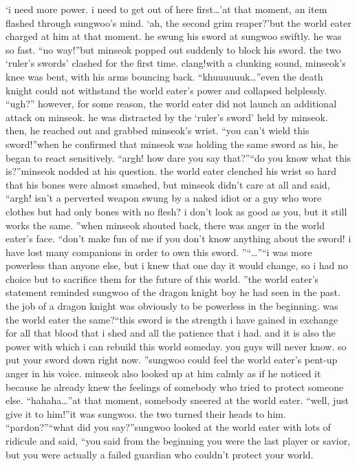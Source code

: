 ‘i need more power.
 i need to get out of here first…’at that moment, an item flashed through sungwoo’s mind.
‘ah, the second grim reaper?’but the world eater charged at him at that moment.
 he swung his sword at sungwoo swiftly.
he was so fast.
“no way!”but minseok popped out suddenly to block his sword.
the two ‘ruler’s swords’ clashed for the first time.
clang!with a clunking sound, minseok’s knee was bent, with his arms bouncing back.
“khuuuuuuk…”even the death knight could not withstand the world eater’s power and collapsed helplessly.
“ugh?”
however, for some reason, the world eater did not launch an additional attack on minseok.
he was distracted by the ‘ruler’s sword’ held by minseok.
 then, he reached out and grabbed minseok’s wrist.
“you can’t wield this sword!”when he confirmed that minseok was holding the same sword as his, he began to react sensitively.
“argh! how dare you say that?”“do you know what this is?”minseok nodded at his question.
the world eater clenched his wrist so hard that his bones were almost smashed, but minseok didn’t care at all and said, “argh! isn’t a perverted weapon swung by a naked idiot or a guy who wore clothes but had only bones with no flesh? i don’t look as good as you, but it still works the same.
”when minseok shouted back, there was anger in the world eater’s face.
“don’t make fun of me if you don’t know anything about the sword! i have lost many companions in order to own this sword.
”“…”“i was more powerless than anyone else, but i knew that one day it would change, so i had no choice but to sacrifice them for the future of this world.
”the world eater’s statement reminded sungwoo of the dragon knight boy he had seen in the past.
 the job of a dragon knight was obviously to be powerless in the beginning.
 was the world eater the same?“this sword is the strength i have gained in exchange for all that blood that i shed and all the patience that i had.
 and it is also the power with which i can rebuild this world someday.
 you guys will never know.
 so put your sword down right now.
”sungwoo could feel the world eater’s pent-up anger in his voice.
 minseok also looked up at him calmly as if he noticed it because he already knew the feelings of somebody who tried to protect someone else.
“hahaha…”at that moment, somebody sneered at the world eater.
“well, just give it to him!”it was sungwoo.
 the two turned their heads to him.
“pardon?”“what did you say?”sungwoo looked at the world eater with lots of ridicule and said, “you said from the beginning you were the last player or savior, but you were actually a failed guardian who couldn’t protect your world.
